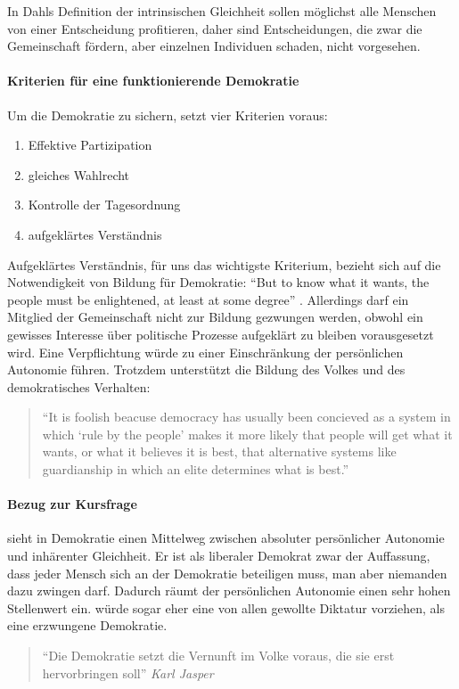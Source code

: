 In Dahls Definition der intrinsischen Gleichheit sollen möglichst alle Menschen von einer Entscheidung profitieren, daher sind Entscheidungen, die zwar die Gemeinschaft fördern, aber einzelnen Individuen schaden, nicht vorgesehen.


\paragraph{Kriterien für eine funktionierende Demokratie}

Um die Demokratie zu sichern, setzt \citeauthor{Dahl-1989-aa} vier Kriterien voraus:
	\begin{enumerate}
		\item Effektive Partizipation
		\item gleiches Wahlrecht
		\item Kontrolle der Tagesordnung
		\item aufgeklärtes Verständnis \parencite[vgl.][100]{Dahl-1989-aa}
	\end{enumerate}

Aufgeklärtes Verständnis, für uns das wichtigste Kriterium, bezieht sich auf die Notwendigkeit von Bildung für Demokratie:
``But to know what it wants, the people must be enlightened, at least at some degree'' \parencite[100]{Dahl-1989-aa}.
Allerdings darf ein Mitglied der Gemeinschaft nicht zur Bildung gezwungen werden, obwohl ein gewisses Interesse über politische Prozesse aufgeklärt zu bleiben vorausgesetzt wird.
Eine Verpflichtung würde zu einer Einschränkung der persönlichen Autonomie führen.
Trotzdem unterstützt \citeauthor{Dahl-1989-aa} die Bildung des Volkes und des demokratisches Verhalten:

	\begin{quote}
		``It is foolish beacuse democracy has usually been concieved as a system in which `rule by the people' makes it more likely that people will get what it wants, or what it believes it is best, that alternative systems like guardianship in which an elite determines what is best.'' \parencite[111]{Dahl-1989-aa}
	\end{quote}


\paragraph{Bezug zur Kursfrage}

\citeauthor{Dahl-1989-aa} sieht in Demokratie einen Mittelweg zwischen absoluter persönlicher Autonomie und inhärenter Gleichheit.
Er ist als liberaler Demokrat zwar der Auffassung, dass jeder Mensch sich an der Demokratie beteiligen muss, man aber niemanden dazu zwingen darf.
Dadurch räumt \citeauthor{Dahl-1989-aa} der persönlichen Autonomie einen sehr hohen Stellenwert ein.
\citeauthor{Dahl-1989-aa} würde sogar eher eine von allen gewollte Diktatur vorziehen, als eine erzwungene Demokratie.

	\begin{quote}
		``Die Demokratie setzt die Vernunft im Volke voraus, die sie erst hervorbringen soll'' \emph{Karl Jasper}
	\end{quote}